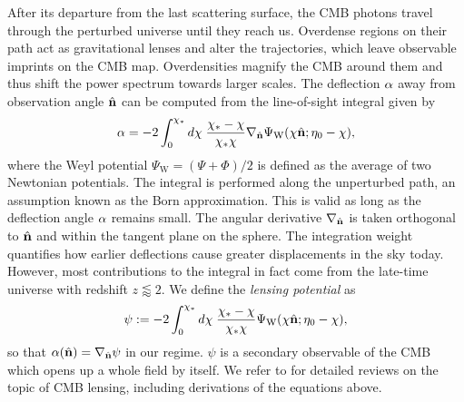 After its departure from the last scattering surface, the CMB photons travel through the perturbed universe until they reach us. Overdense regions on their path act as gravitational lenses and alter the trajectories, which leave observable imprints on the CMB map. Overdensities magnify the CMB around them and thus shift the power spectrum towards larger scales. The deflection $\mathbf{\alpha}$ away from observation angle $\hat{\mathbf{n}}$ can be computed from the line-of-sight integral given by 
\begin{align}
	\mathbf{\alpha} = - 2\int_0^{\chi_*} d\chi \; \frac{\chi_* - \chi}{\chi_* \chi} \nabla_{\hat{\mathbf{n}}} \Psi_\text{W} (\chi\hat{\mathbf{n}}; \eta_0-\chi), 
\end{align}
where the Weyl potential $\Psi_\text{W} = (\Psi + \Phi)/2$ is defined as the average of two Newtonian potentials. The integral is performed along the unperturbed path, an assumption known as the Born approximation. This is valid as long as the deflection angle $\mathbf{\alpha}$ remains small. The angular derivative $\nabla_{\hat{\mathbf{n}}}$ is taken orthogonal to $\hat{\mathbf{n}}$ and within the tangent plane on the sphere. The integration weight quantifies how earlier deflections cause greater displacements in the sky today. However, most contributions to the integral in fact come from the late-time universe with redshift $z\lessapprox2$. We define the \textit{lensing potential} as
\begin{align}
	\psi := - 2\int_0^{\chi_*} d\chi \; \frac{\chi_* - \chi}{\chi_* \chi}  \Psi_\text{W} (\chi\hat{\mathbf{n}}; \eta_0-\chi), \label{def:lensing_potential}
\end{align}
so that $\mathbf{\alpha}(\hat{\mathbf{n}}) = \nabla_{\hat{\mathbf{n}}} \psi$ in our regime. $\psi$ is a secondary observable of the CMB which opens up a whole field by itself. We refer to \cite{Bartelmann2001weaklensing,Lewis2006weaklensing,Hanson2010weaklensing} for detailed reviews on the topic of CMB lensing, including derivations of the equations above.


